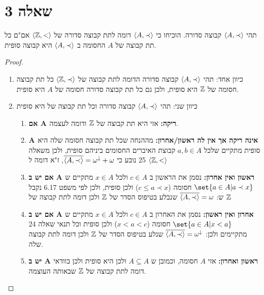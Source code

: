 \documentclass{article}
\DeclarePairedDelimiter\set\{\}
\begin{document}
	\section*{שאלה 3}
	תהי $\langle A, \prec \rangle$ קבוצה סדורה. הוכיחו כי $\langle A, \prec \rangle$ דומה לתת קבוצה סדורה של $\langle \mathbb{Z}, < \rangle$
	אם"ם כל תת קבוצה של $A$ החסומה ב $\langle A, \prec \rangle$ היא קבוצה סופית.
	\begin{proof}
		\begin{enumerate}
			\item כיוון אחד: תהי $\langle A, \prec \rangle$ קבוצה סדורה הדומה לתת קבוצה של $\langle \mathbb{Z}, \prec \rangle$ כל תת קבוצה חסומה של $\mathbb{Z}$ היא סופית, ולכן גם כל תת קבוצה סדורה חסומה של $A$ היא סופית.
			\item כיוון שני: תהי $\langle A, \prec \rangle$ קבוצה סדורה וכל תת קבוצה של היא סופית
			\begin{enumerate}
				\item \textbf{אם A ריקה:} אזי היא תת קבוצה של $\mathbb{Z}$ ודומה לעצמה.
				\item \textbf{A אינה ריקה אך אין לה ראשון/אחרון:} מההנחה שכל תת קבוצה חסומה שלה היא סופית מתקיים שלכל $a,b \in A$
				קבוצת האיברים החסומים ביניהם סופית, ולכן משאלה 25 נובע כי $\overline{\langle A, \prec \rangle} = \omega^{\downarrow} + \omega$, ז"א דומה ל $\langle \mathbb{Z}, < \rangle$

				\item \textbf{אם יש ב A ראשון ואין אחרון:} נסמן את הראשון ב $c \in A$ ולכל $x \in A$ מתקיים ש $\set{a \in A | a \prec x}$ חסומה ($c \leq a \prec x$) ולכן סופית, ולכן לפי משפט 6.17 נקבל ש: $\overline{\langle A, \prec \rangle} = \omega$ שנבלע בטיפוס הסדר של $\mathbb{Z}$ ולכן דומה לתת קבוצה של $\mathbb{Z}$
				\item \textbf{אם יש ב A אחרון ואין ראשון:} נסמן את האחרון ב $c \in A$ ולכל $x \in A$ מתקיים ש $\set{a \in A | x < a}$ חסומה ($x < a < c$) ולכן סופית וכל תנאי שאלה 24 מתקיימים ולכן: $\overline{\langle A, \prec \rangle} = \omega^{\downarrow}$ שנלע בטיפוס הסדר של $\mathbb{Z}$ ולכן דומה לתת קבוצה שלה.
				\item \textbf{יש ב A ראשון ואחרון:} אזי $A$ חסומה, וכמובן ש $A \subseteq A$ ולכן היא סופית ולכן בוודאי דומה לתת קבוצה של $\mathbb{Z}$ שבאותה העוצמה.
			\end{enumerate}
		\end{enumerate}
	\end{proof}
\end{document}
